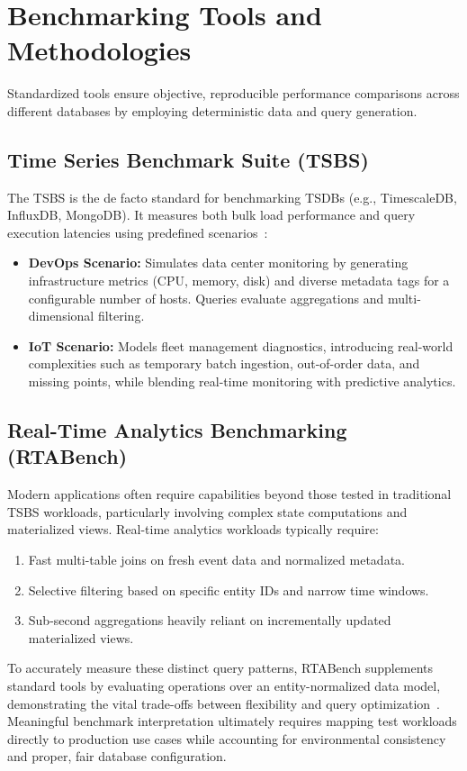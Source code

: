 \section{Benchmarking Tools and Methodologies}

Standardized tools ensure objective, reproducible performance comparisons
across different databases by employing deterministic data and query
generation.

\subsection{Time Series Benchmark Suite (TSBS)}

The TSBS is the de facto standard for benchmarking TSDBs (e.g., TimescaleDB,
InfluxDB, MongoDB). It measures both bulk load performance and query execution
latencies using predefined scenarios~\cite{TSBS:01}:

\begin{itemize}
    \item \textbf{DevOps Scenario:} Simulates data center monitoring by generating infrastructure metrics (CPU, memory, disk) and diverse metadata tags for a configurable number of hosts. Queries evaluate aggregations and multi-dimensional filtering.
    \item \textbf{IoT Scenario:} Models fleet management diagnostics, introducing real-world complexities such as temporary batch ingestion, out-of-order data, and missing points, while blending real-time monitoring with predictive analytics.
\end{itemize}

\subsection{Real-Time Analytics Benchmarking (RTABench)}

Modern applications often require capabilities beyond those tested in
traditional TSBS workloads, particularly involving complex state computations
and materialized views. Real-time analytics workloads typically require:
\begin{enumerate}
    \item Fast multi-table joins on fresh event data and normalized metadata.
    \item Selective filtering based on specific entity IDs and narrow time windows.
    \item Sub-second aggregations heavily reliant on incrementally updated materialized
          views.
\end{enumerate}

To accurately measure these distinct query patterns, RTABench supplements
standard tools by evaluating operations over an entity-normalized data model,
demonstrating the vital trade-offs between flexibility and query
optimization~\cite{RTABench:01}. Meaningful benchmark interpretation ultimately
requires mapping test workloads directly to production use cases while
accounting for environmental consistency and proper, fair database
configuration.
